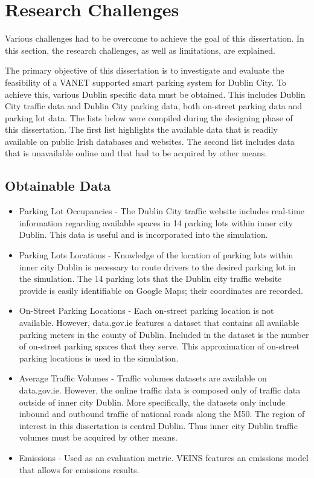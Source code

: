 \section{Research Challenges}
Various challenges had to be overcome to achieve the goal of this dissertation. In this section, the research challenges, as well as limitations, are explained.

The primary objective of this dissertation is to investigate and evaluate the feasibility of a \ac{VANET} supported smart parking system for Dublin City. To achieve this, various Dublin specific data must be obtained. This includes Dublin City traffic data and Dublin City parking data, both on-street parking data and parking lot data. The lists below were compiled during the designing phase of this dissertation. The first list highlights the available data that is readily available on public Irish databases and websites. The second list includes data that is unavailable online and that had to be acquired by other means.

\subsection*{Obtainable Data}
\begin{itemize}
    \item Parking Lot Occupancies - The Dublin City traffic website includes real-time information regarding available spaces in 14 parking lots within inner city Dublin. This data is useful and is incorporated into the simulation.
    \item Parking Lots Locations - Knowledge of the location of parking lots within inner city Dublin is necessary to route drivers to the desired parking lot in the simulation. The 14 parking lots that the Dublin city traffic website provide is easily identifiable on Google Maps; their coordinates are recorded.
    \item On-Street Parking Locations - Each on-street parking location is not available. However, data.gov.ie features a dataset that contains all available parking meters in the county of Dublin. Included in the dataset is the number of on-street parking spaces that they serve. This approximation of on-street parking locations is used in the simulation.
    \item Average Traffic Volumes - Traffic volumes datasets are available on data.gov.ie. However, the online traffic data is composed only of traffic data outside of inner city Dublin. More specifically, the datasets only include inbound and outbound traffic of national roads along the M50. The region of interest in this dissertation is central Dublin. Thus inner city Dublin traffic volumes must be acquired by other means.
    \item Emissions - Used as an evaluation metric. \ac{VEINS} features an emissions model that allows for emissions results.
\end{itemize}

